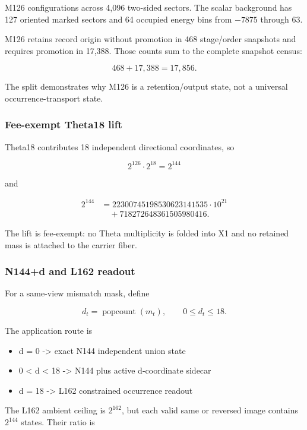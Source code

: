 M126 configurations across 4,096 two-sided sectors. The scalar
background has 127 oriented marked sectors and 64 occupied energy bins
from \(-7875\) through 63.

M126 retains record origin without promotion in 468 stage/order
snapshots and requires promotion in 17,388. Those counts sum to the
complete snapshot census:

\[
468+17{,}388=17{,}856.
\]

The split demonstrates why M126 is a retention/output state, not a
universal occurrence-transport state.

\subsubsection{Fee-exempt Theta18 lift}\label{viii-ch08-fee-exempt-theta18-lift}

Theta18 contributes 18 independent directional coordinates, so

\[
2^{126}\cdot2^{18}=2^{144}
\]

and

\[
\begin{aligned}2^{144}&=22300745198530623141535\cdot10^{21}\\&\quad+718272648361505980416.\end{aligned}
\]

The lift is fee-exempt: no Theta multiplicity is folded into X1 and no
retained mass is attached to the carrier fiber.

\subsubsection{N144+d and L162 readout}\label{viii-ch08-n144d-and-l162-readout}

For a same-view mismatch mask, define

\[
d_t=\operatorname{popcount}(m_t),\qquad0\le d_t\le18.
\]

The application route is

\begin{itemize}
\tightlist
\item
  d = 0 -\textgreater{} exact N144 independent union state
\item
  0 \textless{} d \textless{} 18 -\textgreater{} N144 plus active
  d-coordinate sidecar
\item
  d = 18 -\textgreater{} L162 constrained occurrence readout
\end{itemize}

The L162 ambient ceiling is \(2^{162}\), but each valid same or reversed
image contains \(2^{144}\) states. Their ratio is

